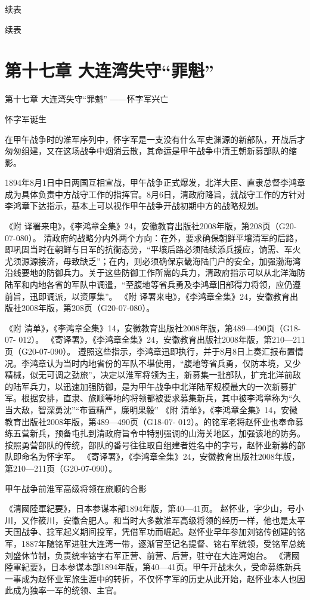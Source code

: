 \documentclass[12pt,UTF8]{ctexbook}
\begin{document}
续表


续表



\chapter{第十七章 大连湾失守“罪魁”}

第十七章
大连湾失守“罪魁”
——怀字军兴亡

怀字军诞生

在甲午战争时的淮军序列中，怀字军是一支没有什么军史渊源的新部队，开战后才匆匆组建，又在这场战争中烟消云散，其命运是甲午战争中清王朝新募部队的缩影。

1894年8月1日中日两国互相宣战，甲午战争正式爆发，北洋大臣、直隶总督李鸿章成为具体负责中方战守工作的指挥官。8月6日，清政府降旨，就战守工作的方针对李鸿章下达指示，基本上可以视作甲午战争开战初期中方的战略规划。

《附 译署来电》，《李鸿章全集》24，安徽教育出版社2008年版，第208页（G20-07-080）。
清政府的战略分内外两个方向：在外，要求确保朝鲜平壤清军的后路，即巩固当时在朝鲜与日军的抗衡态势，“平壤后路必须陆续添兵援应，饷需、军火尤须源源接济，毋致缺乏”；在内，则必须确保京畿海陆门户的安全，加强渤海湾沿线要地的防御兵力。关于这些防御工作所需的兵力，清政府指示可以从北洋海防陆军和内地各省的军队中调遣，“至腹地等省兵勇及李鸿章旧部得力将领，应仍遵前旨，迅即调派，以资厚集”。 《附 译署来电》，《李鸿章全集》24，安徽教育出版社2008年版，第208页（G20-07-080）。

《附 清单》，《李鸿章全集》14，安徽教育出版社2008年版，第489—490页（G18-07- 012）。
《寄译署》，《李鸿章全集》24，安徽教育出版社2008年版，第210—211页（G20-07-090）。
遵照这些指示，李鸿章迅即执行，并于8月8日上奏汇报布置情况。李鸿章认为当时内地省份的军队不堪使用，“腹地等省兵勇，仅防本境，又少精械，似无可调之劲旅”，决定以淮军将领为主，新募集一批部队，扩充北洋前敌的陆军兵力，以迅速加强防御，是为甲午战争中北洋陆军规模最大的一次新募扩军。根据安排，直隶、旅顺等地的将领都被要求募集新兵，其中被李鸿章称为“久当大敌，智深勇沈”“布置精严，廉明果毅” 《附 清单》，《李鸿章全集》14，安徽教育出版社2008年版，第489—490页（G18-07- 012）。的铭军老将赵怀业也奉命募练五营新兵，预备屯扎到清政府旨令中特别强调的山海关地区，加强该地的防务。按照勇营部队的传统，部队的番号往往取自组建者姓名中的字号，赵怀业新募的部队即命名为怀字军。 《寄译署》，《李鸿章全集》24，安徽教育出版社2008年版，第210—211页（G20-07-090）。


甲午战争前淮军高级将领在旅顺的合影

《清國陸軍紀要》，日本参谋本部1894年版，第40—41页。
赵怀业，字少山，号小川，又作筱川，安徽合肥人。和当时大多数淮军高级将领的经历一样，他也是太平天国战争、捻军起义期间投军，凭借军功而崛起。赵怀业早年参加刘铭传创建的铭军，1887年随铭军进驻大连湾一带，逐渐官至记名提督、铭右军统领，受铭军总统刘盛休节制，负责统率铭字右军正营、前营、后营，驻守在大连湾炮台。 《清國陸軍紀要》，日本参谋本部1894年版，第40—41页。甲午开战未久，受命募练新兵一事成为赵怀业军旅生涯中的转折，不仅怀字军的历史从此开始，赵怀业本人也因此成为独率一军的统领、主官。
\end{document}

